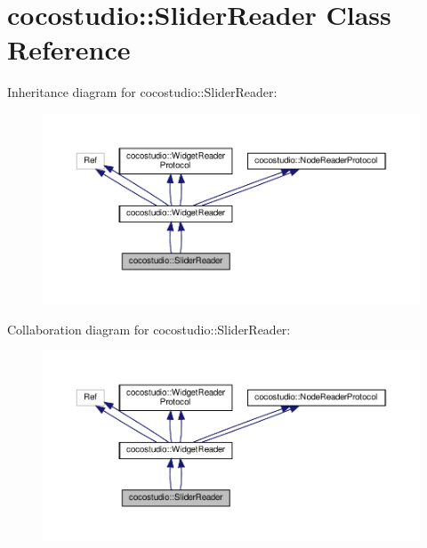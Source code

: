 \hypertarget{classcocostudio_1_1SliderReader}{}\section{cocostudio\+:\+:Slider\+Reader Class Reference}
\label{classcocostudio_1_1SliderReader}


Inheritance diagram for cocostudio\+:\+:Slider\+Reader\+:
\nopagebreak
\begin{figure}[H]
\begin{center}
\leavevmode
\includegraphics[width=350pt]{classcocostudio_1_1SliderReader__inherit__graph}
\end{center}
\end{figure}


Collaboration diagram for cocostudio\+:\+:Slider\+Reader\+:
\nopagebreak
\begin{figure}[H]
\begin{center}
\leavevmode
\includegraphics[width=350pt]{classcocostudio_1_1SliderReader__coll__graph}
\end{center}
\end{figure}
